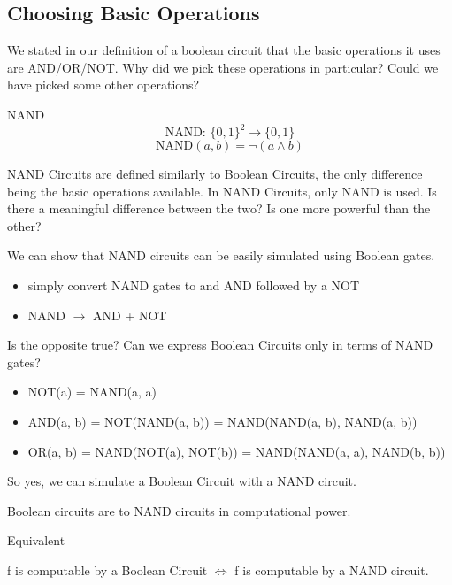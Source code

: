 \subsection*{Choosing Basic Operations}
We stated in our definition of a boolean circuit that the basic operations it uses are AND/OR/NOT. Why did we pick these operations in particular? Could we have picked some other operations?

\begin{definition}
    NAND 
    \[
        \text{NAND: } \{0,1\}^2 \rightarrow \{0,1\}  
    \]
    \[
        \text{NAND}(a, b) = \lnot(a \land b)
    \]
\end{definition}

NAND Circuits are defined similarly to Boolean Circuits, the only difference being the basic operations available. In NAND Circuits, only NAND is used. Is there a meaningful difference between the two? Is one more powerful than the other?

We can show that NAND circuits can be easily simulated using Boolean gates.
\begin{itemize}
    \item simply convert NAND gates to and AND followed by a NOT
    \item NAND $\rightarrow$ AND + NOT
\end{itemize}

Is the opposite true? Can we express Boolean Circuits only in terms of NAND gates?
\begin{itemize}
    \item NOT(a) = NAND(a, a)
    \item AND(a, b) = NOT(NAND(a, b)) = NAND(NAND(a, b), NAND(a, b))
    \item OR(a, b) = NAND(NOT(a), NOT(b)) = NAND(NAND(a, a), NAND(b, b))
\end{itemize}
So yes, we can simulate a Boolean Circuit with a NAND circuit.

\begin{theorem}
    Boolean circuits are  to NAND circuits in computational power. 
\end{theorem}

\begin{definition}
    Equivalent 

    f is computable by a Boolean Circuit $\iff$ f is computable by a NAND circuit.
\end{definition}

\hr

